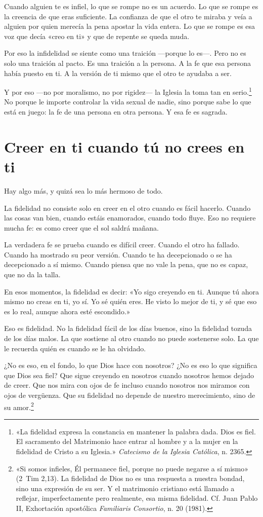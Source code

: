 Cuando alguien te es infiel, lo que se rompe no es un acuerdo. Lo que se rompe es la creencia de que eras suficiente. La confianza de que el otro te miraba y veía a alguien por quien merecía la pena apostar la vida entera. Lo que se rompe es esa voz que decía «creo en ti» y que de repente se queda muda.

Por eso la infidelidad se siente como una traición ---porque lo es---. Pero no es solo una traición al pacto. Es una traición a la persona. A la fe que esa persona había puesto en ti. A la versión de ti mismo que el otro te ayudaba a ser.

Y por eso ---no por moralismo, no por rigidez--- la Iglesia la toma tan en serio.\footnote{«La fidelidad expresa la constancia en mantener la palabra dada. Dios es fiel. El sacramento del Matrimonio hace entrar al hombre y a la mujer en la fidelidad de Cristo a su Iglesia.» \textit{Catecismo de la Iglesia Católica}, n. 2365.} No porque le importe controlar la vida sexual de nadie, sino porque sabe lo que está en juego: la fe de una persona en otra persona. Y esa fe es sagrada.

\section{Creer en ti cuando tú no crees en ti}

Hay algo más, y quizá sea lo más hermoso de todo.

La fidelidad no consiste solo en creer en el otro cuando es fácil hacerlo. Cuando las cosas van bien, cuando estáis enamorados, cuando todo fluye. Eso no requiere mucha fe: es como creer que el sol saldrá mañana.

La verdadera fe se prueba cuando es difícil creer. Cuando el otro ha fallado. Cuando ha mostrado su peor versión. Cuando te ha decepcionado o se ha decepcionado a sí mismo. Cuando piensa que no vale la pena, que no es capaz, que no da la talla.

En esos momentos, la fidelidad es decir: «Yo sigo creyendo en ti. Aunque tú ahora mismo no creas en ti, yo sí. Yo sé quién eres. He visto lo mejor de ti, y sé que eso es lo real, aunque ahora esté escondido.»

Eso es fidelidad. No la fidelidad fácil de los días buenos, sino la fidelidad tozuda de los días malos. La que sostiene al otro cuando no puede sostenerse solo. La que le recuerda quién es cuando se le ha olvidado.

¿No es eso, en el fondo, lo que Dios hace con nosotros? ¿No es eso lo que significa que Dios sea fiel? Que sigue creyendo en nosotros cuando nosotros hemos dejado de creer. Que nos mira con ojos de fe incluso cuando nosotros nos miramos con ojos de vergüenza. Que su fidelidad no depende de nuestro merecimiento, sino de su amor.\footnote{«Si somos infieles, Él permanece fiel, porque no puede negarse a sí mismo» (2~Tim 2,13). La fidelidad de Dios no es una respuesta a nuestra bondad, sino una expresión de su ser. Y el matrimonio cristiano está llamado a reflejar, imperfectamente pero realmente, esa misma fidelidad. Cf. Juan Pablo II, Exhortación apostólica \textit{Familiaris Consortio}, n. 20 (1981).}

